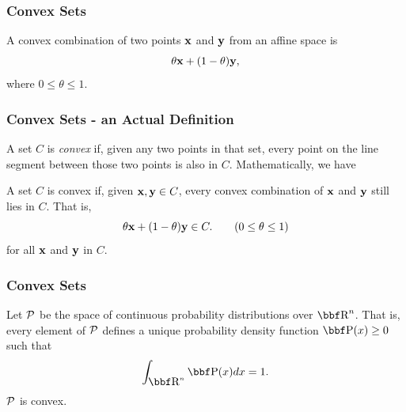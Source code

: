 \documentclass{beamer}
\begin{document}
\begin{frame}
    \frametitle{Convex Sets}
    \begin{definition}
        A convex combination of two points ${\bf x}$ and ${\bf y}$ from an affine space is
        \[
            \theta{\bf x} + (1-\theta){\bf y},
        \]
        where $0\leq\theta\leq1$.\\[2em]
    \end{definition}

    \begin{center}
    \end{center}
\end{frame}

\begin{frame}
    \frametitle{Convex Sets - an Actual Definition}
    A set $C$ is \textit{convex} if, given any two points in that set, every point on the line
    segment between those two points is also in $C$. Mathematically, we have

    \begin{definition}
        A set $C$ is convex if, given ${\bf x}, {\bf y}\in C$, every convex combination of ${\bf x}$ and ${\bf y}$
        still lies in $C$. That is,
        \[
            \theta{\bf x} + (1-\theta){\bf y} \in C. \tag{$0\leq\theta\leq1$}
        \]
        for all ${\bf x}$ and ${\bf y}$ in $C$.
    \end{definition}
\end{frame}

\begin{frame}
    \frametitle{Convex Sets}
    \begin{example}
        Let ${\cal P}$ be the space of continuous probability distributions over
        $\RR^n$. That is, every element of ${\cal P}$ defines a unique probability
        density function $\PP(x) \geq 0$ such that \[\int_{\RR^n} \PP(x) dx=1.\]
        ${\cal P}$ is convex.
    \end{example}
\end{frame}
\end{document}
